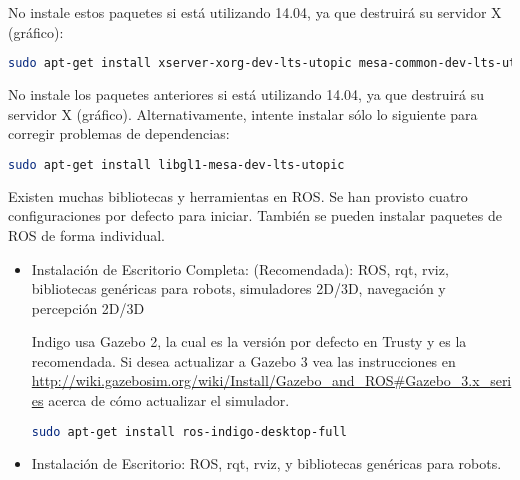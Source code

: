 \begin{enumerate}
	\begin{redwarningbox}
	No instale estos paquetes si está utilizando 14.04, ya que destruirá su servidor X (gráfico):
	\end{redwarningbox}
	\begin{blackcodebox}
	\begin{lstlisting}[language=bash]
sudo apt-get install xserver-xorg-dev-lts-utopic mesa-common-dev-lts-utopic libxatracker-dev-lts-utopic libopenvg1-mesa-dev-lts-utopic libgles2-mesa-dev-lts-utopic libgles1-mesa-dev-lts-utopic libgl1-mesa-dev-lts-utopic libgbm-dev-lts-utopic libegl1-mesa-dev-lts-utopic
	\end{lstlisting}
	\end{blackcodebox}
	\begin{redwarningbox}
	No instale los paquetes anteriores si está utilizando 14.04, ya que destruirá su servidor X (gráfico). Alternativamente, intente instalar sólo lo siguiente para corregir problemas de dependencias:
	\end{redwarningbox}
	\begin{blackcodebox}
	\begin{lstlisting}[language=bash]
sudo apt-get install libgl1-mesa-dev-lts-utopic
	\end{lstlisting}
	\end{blackcodebox}

	Existen muchas bibliotecas y herramientas en ROS. Se han provisto cuatro configuraciones por defecto para iniciar. También se pueden instalar paquetes de ROS de forma individual.

	\begin{itemize}
		\item Instalación de Escritorio Completa: (Recomendada): ROS, rqt, rviz, bibliotecas genéricas para robots, simuladores 2D/3D, navegación y percepción 2D/3D

		Indigo usa Gazebo 2, la cual es la versión por defecto en Trusty y es la recomendada. Si desea actualizar a Gazebo 3 vea las instrucciones en \url{http://wiki.gazebosim.org/wiki/Install/Gazebo_and_ROS#Gazebo_3.x_series} acerca de cómo actualizar el simulador.


		\begin{blackcodebox}
		\begin{lstlisting}[language=bash]
sudo apt-get install ros-indigo-desktop-full
		\end{lstlisting}
		\end{blackcodebox}

		\item Instalación de Escritorio: ROS, rqt, rviz, y bibliotecas genéricas para robots.


\end{itemize}
\end{enumerate}
